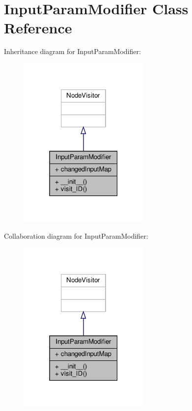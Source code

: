 \hypertarget{classVisitors_1_1InputParamModifier}{}\section{Input\+Param\+Modifier Class Reference}
\label{classVisitors_1_1InputParamModifier}


Inheritance diagram for Input\+Param\+Modifier\+:\nopagebreak
\begin{figure}[H]
\begin{center}
\leavevmode
\includegraphics[width=183pt]{classVisitors_1_1InputParamModifier__inherit__graph}
\end{center}
\end{figure}


Collaboration diagram for Input\+Param\+Modifier\+:\nopagebreak
\begin{figure}[H]
\begin{center}
\leavevmode
\includegraphics[width=183pt]{classVisitors_1_1InputParamModifier__coll__graph}
\end{center}
\end{figure}

